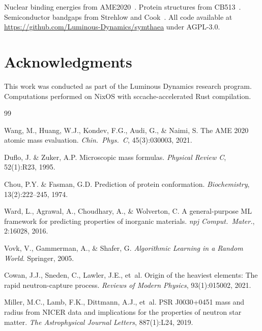 \documentclass[twocolumn,letterpaper,10pt]{article}
\begin{document}
Nuclear binding energies from AME2020~\citep{ame2020}. Protein structures
from CB513~\citep{cb513}. Semiconductor bandgaps from Strehlow and
Cook~\citep{strehlow1973}. All code available at
\url{https://github.com/Luminous-Dynamics/symthaea} under AGPL-3.0.

\section*{Acknowledgments}

This work was conducted as part of the Luminous Dynamics research program.
Computations performed on NixOS with sccache-accelerated Rust compilation.



\begin{thebibliography}{99}

Wang, M., Huang, W.J., Kondev, F.G., Audi, G., \& Naimi, S.
\newblock The AME 2020 atomic mass evaluation.
\newblock \emph{Chin.\ Phys.\ C}, 45(3):030003, 2021.

Duflo, J. \& Zuker, A.P.
\newblock Microscopic mass formulas.
\newblock \emph{Physical Review C}, 52(1):R23, 1995.

Chou, P.Y. \& Fasman, G.D.
\newblock Prediction of protein conformation.
\newblock \emph{Biochemistry}, 13(2):222--245, 1974.

Ward, L., Agrawal, A., Choudhary, A., \& Wolverton, C.
\newblock A general-purpose ML framework for predicting
  properties of inorganic materials.
\newblock \emph{npj Comput.\ Mater.}, 2:16028, 2016.

Vovk, V., Gammerman, A., \& Shafer, G.
\newblock \emph{Algorithmic Learning in a Random World}.
\newblock Springer, 2005.

Cowan, J.J., Sneden, C., Lawler, J.E., et~al.
\newblock Origin of the heaviest elements: The rapid neutron-capture process.
\newblock \emph{Reviews of Modern Physics}, 93(1):015002, 2021.

Miller, M.C., Lamb, F.K., Dittmann, A.J., et~al.
\newblock PSR J0030+0451 mass and radius from NICER data and implications
  for the properties of neutron star matter.
\newblock \emph{The Astrophysical Journal Letters}, 887(1):L24, 2019.


\end{thebibliography}
\end{document}
